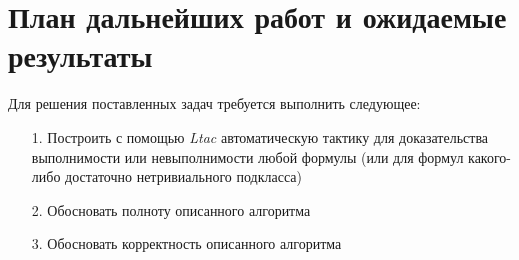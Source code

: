 \documentclass[12pt]{article}
\begin{document}
\section{План дальнейших работ и ожидаемые результаты}
Для решения поставленных задач требуется выполнить следующее:
\begin{enumerate}
    
    \item[1.] Построить с помощью \textit{Ltac} автоматическую тактику для доказательства выполнимости или невыполнимости любой формулы (или для формул какого-либо достаточно нетривиального подкласса)
    \item[2.] Обосновать полноту описанного алгоритма
    \item[3.] Обосновать корректность описанного алгоритма

\end{enumerate}
\clearpage
\end{document}
